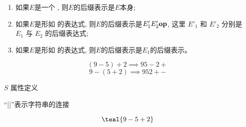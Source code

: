 

\begin{frame}{}
  \begin{definition}
    \begin{enumerate}[(1)]
      \setlength{\itemsep}{8pt}
      \item 如果$E$是一个 , 则$E$的后缀表示是$E$本身;
      \item 如果$E$是形如  的表达式,
        则$E$的后缀表示是$E'_{1} E'_{2} \text{\bf op}$,
        这里 $E'_{1}$ 和 $E'_{2}$ 分别是 $E_{1}$ 与 $E_{2}$ 的后缀表达式;
      \item 如果$E$是形如  的表达式, 则$E$的后缀表示是$E_{1}$的后缀表示。
    \end{enumerate}
  \end{definition}

  \pause
  \begin{center}
    \[
      (9-5)+2 \implies 95-2+
    \]
    \[
      9-(5+2) \implies 952+-
    \]
  \end{center}
\end{frame}

\begin{frame}{}
  \begin{center}
     $S$ 属性定义


    ``||''表示字符串的连接
  \end{center}
\end{frame}

\begin{frame}{}
  \[
    \teal{9 - 5 + 2}
  \]
\end{frame}

